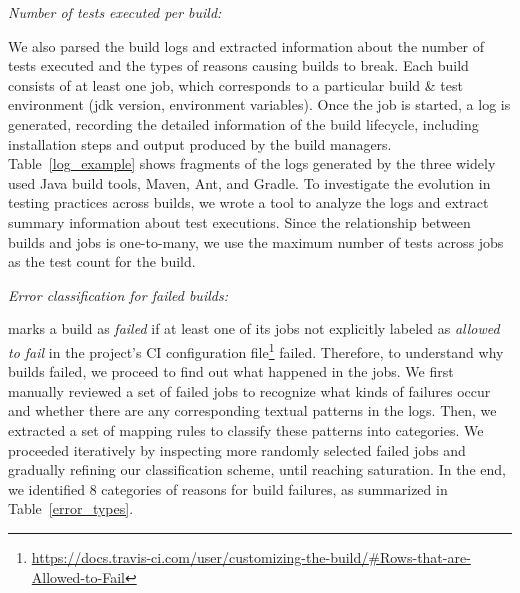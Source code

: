 

\smallskip\noindent\emph{Number of tests executed per build:} 

We also parsed the \Tvis build logs and extracted information about the 
number of tests executed and the types of reasons causing builds to break.
Each \Tvis build consists of at least one job, which corresponds to a particular
build \& test environment (\eg jdk version, environment variables). 
Once the job is started, a log is generated, recording the detailed information
of the build lifecycle, including installation steps and output produced by the 
build managers. %
Table~\ref{log_example} shows fragments of the logs generated by the 
three widely used Java build tools, Maven, Ant, and Gradle. 
To investigate the evolution in testing practices across builds, we wrote a tool 
to analyze the logs and extract summary information about test executions.  
Since the relationship between builds and jobs is one-to-many, we use the 
maximum number of tests across jobs as the test count for the build. 



\smallskip\noindent\emph{Error classification for failed builds:}

\Tvis marks a build as \textit{failed} if at least one of its jobs not explicitly 
labeled as \emph{allowed to fail} in the project's CI configuration 
file\footnote{\url{https://docs.travis-ci.com/user/customizing-the-build/#Rows-that-are-Allowed-to-Fail}} failed.
Therefore, to understand why \Tvis builds failed, we proceed to find out 
what happened in the jobs. 
We first manually reviewed a set of failed jobs to recognize what kinds of 
failures occur and whether there are any corresponding textual patterns in 
the logs.
Then, we extracted a set of mapping rules to classify these patterns into 
categories.
We proceeded iteratively by inspecting more randomly selected failed jobs
and gradually refining our classification scheme, until reaching saturation. 
In the end, we identified 8 categories of reasons for build failures, 
as summarized in Table~\ref{error_types}. 

